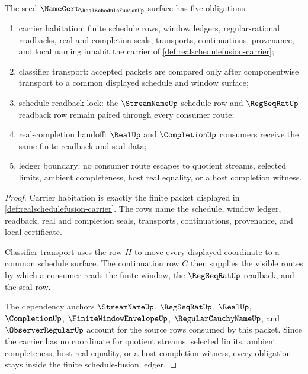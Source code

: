 \begin{theorem}
\label{thm:realschedulefusion-namecert-obligations}
The seed $\NameCert_{\RealScheduleFusionUp}$ surface has five obligations:
\begin{enumerate}
\item carrier habitation: finite schedule rows, window ledgers, regular-rational readbacks, real and completion seals, transports, continuations, provenance, and local naming inhabit the carrier of \autoref{def:realschedulefusion-carrier};
\item classifier transport: accepted packets are compared only after componentwise transport to a common displayed schedule and window surface;
\item schedule-readback lock: the $\StreamNameUp$ schedule row and $\RegSeqRatUp$ readback row remain paired through every consumer route;
\item real-completion handoff: $\RealUp$ and $\CompletionUp$ consumers receive the same finite readback and seal data;
\item ledger boundary: no consumer route escapes to quotient streams, selected limits, ambient completeness, host real equality, or a host completion witness.
\end{enumerate}
\end{theorem}
\begin{proof}
Carrier habitation is exactly the finite packet displayed in \autoref{def:realschedulefusion-carrier}. The rows name the schedule, window ledger, readback, real and completion seals, transports, continuations, provenance, and local certificate.

Classifier transport uses the row $H$ to move every displayed coordinate to a common schedule surface. The continuation row $C$ then supplies the visible routes by which a consumer reads the finite window, the $\RegSeqRatUp$ readback, and the seal row.

The dependency anchors $\StreamNameUp$, $\RegSeqRatUp$, $\RealUp$, $\CompletionUp$, $\FiniteWindowEnvelopeUp$, $\RegularCauchyNameUp$, and $\ObserverRegularUp$ account for the source rows consumed by this packet. Since the carrier has no coordinate for quotient streams, selected limits, ambient completeness, host real equality, or a host completion witness, every obligation stays inside the finite schedule-fusion ledger.
\end{proof}

